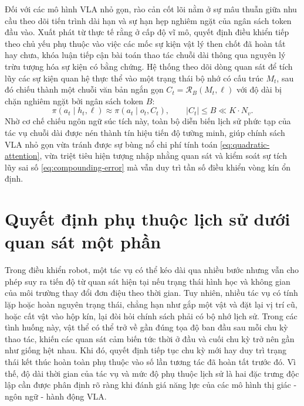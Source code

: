 Đối với các mô hình VLA nhỏ gọn, rào cản cốt lõi nằm ở sự mâu thuẫn giữa nhu cầu theo dõi tiến trình dài hạn và sự hạn hẹp nghiêm ngặt của ngân sách token đầu vào. Xuất phát từ thực tế rằng ở cấp độ vĩ mô, quyết định điều khiển tiếp theo chủ yếu phụ thuộc vào việc các mốc sự kiện vật lý then chốt đã hoàn tất hay chưa, khóa luận tiếp cận bài toán thao tác chuỗi dài thông qua nguyên lý trừu tượng hóa sự kiện có bằng chứng. Hệ thống theo dõi dòng quan sát để tích lũy các sự kiện quan hệ thực thể vào một trạng thái bộ nhớ có cấu trúc $M_t$, sau đó chiếu thành một chuỗi văn bản ngắn gọn $C_t = \mathcal{R}_B(M_t, \ell)$ với độ dài bị chặn nghiêm ngặt bởi ngân sách token $B$:
\begin{equation}
\pi(a_t \mid h_t, \ell) \approx \pi(a_t \mid o_t, C_t), \qquad |C_t| \le B \ll K \cdot N_v.
\label{eq:event-projection-policy}
\end{equation}
Nhờ cơ chế chiếu ngôn ngữ súc tích này, toàn bộ diễn biến lịch sử phức tạp của tác vụ chuỗi dài được nén thành tín hiệu tiến độ tường minh, giúp chính sách VLA nhỏ gọn vừa tránh được sự bùng nổ chi phí tính toán \eqref{eq:quadratic-attention}, vừa triệt tiêu hiện tượng nhập nhằng quan sát và kiểm soát sự tích lũy sai số \eqref{eq:compounding-error} mà vẫn duy trì tần số điều khiển vòng kín ổn định.

\section{Quyết định phụ thuộc lịch sử dưới quan sát một phần}

Trong điều khiển robot, một tác vụ có thể kéo dài qua nhiều bước nhưng vẫn cho phép suy ra tiến độ từ quan sát hiện tại nếu trạng thái hình học và không gian của môi trường thay đổi đơn điệu theo thời gian. Tuy nhiên, nhiều tác vụ có tính lặp hoặc hoàn nguyên trạng thái, chẳng hạn như gắp một vật và đặt lại vị trí cũ, hoặc cất vật vào hộp kín, lại đòi hỏi chính sách phải có bộ nhớ lịch sử. Trong các tình huống này, vật thể có thể trở về gần đúng tọa độ ban đầu sau mỗi chu kỳ thao tác, khiến các quan sát cảm biến tức thời ở đầu và cuối chu kỳ trở nên gần như giống hệt nhau. Khi đó, quyết định tiếp tục chu kỳ mới hay duy trì trạng thái kết thúc hoàn toàn phụ thuộc vào số lần tương tác đã hoàn tất trước đó. Vì thế, độ dài thời gian của tác vụ và mức độ phụ thuộc lịch sử là hai đặc trưng độc lập cần được phân định rõ ràng khi đánh giá năng lực của các mô hình thị giác - ngôn ngữ - hành động VLA.

